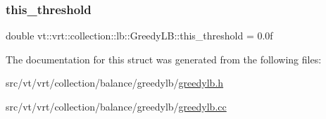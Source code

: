 \subsubsection{\texorpdfstring{this\+\_\+threshold}{this\_threshold}}
{\footnotesize\ttfamily double vt\+::vrt\+::collection\+::lb\+::\+Greedy\+L\+B\+::this\+\_\+threshold = 0.\+0f\hspace{0.3cm}{\ttfamily [private]}}



The documentation for this struct was generated from the following files\+:\begin{DoxyCompactItemize}
\item 
src/vt/vrt/collection/balance/greedylb/\hyperlink{greedylb_8h}{greedylb.\+h}\item 
src/vt/vrt/collection/balance/greedylb/\hyperlink{greedylb_8cc}{greedylb.\+cc}\end{DoxyCompactItemize}
